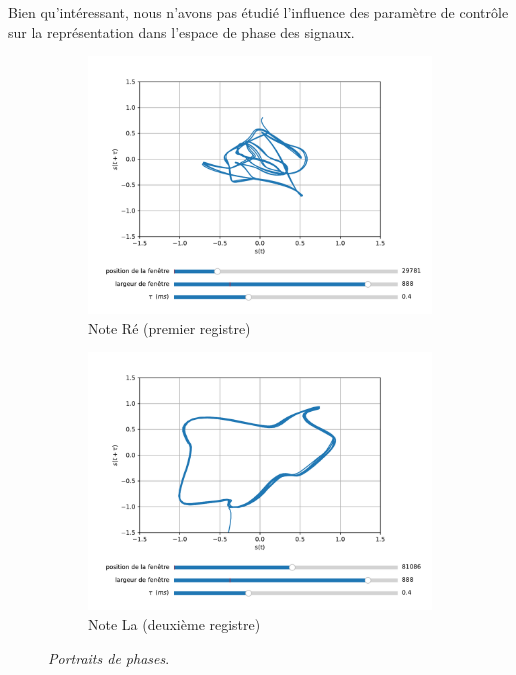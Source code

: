 \documentclass[french, twocolumn]{article}
\begin{document}
Bien qu'intéressant, nous n'avons pas étudié l'influence des paramètre de contrôle sur la représentation dans l'espace de phase des signaux. 

\begin{figure}[h!]
    \centering
    \begin{subfigure}[b]{0.9\linewidth}
        \includegraphics[width=\columnwidth]{Descripteurs/images/espace_des_phases_premier_registre.pdf}
        \caption{Note Ré (premier registre)}
        \label{fig:phase-reg-1}
    \end{subfigure}
    \hfill
    \begin{subfigure}[b]{0.9\linewidth}
        \centering
        \includegraphics[width=\columnwidth]{Descripteurs/images/espace_des_phases_second_registre.pdf}
        \caption{Note La (deuxième registre)}
        \label{fig:phase-reg-2}
    \end{subfigure}
    \caption{\emph{Portraits de phases}.}
\end{figure}
\end{document}
